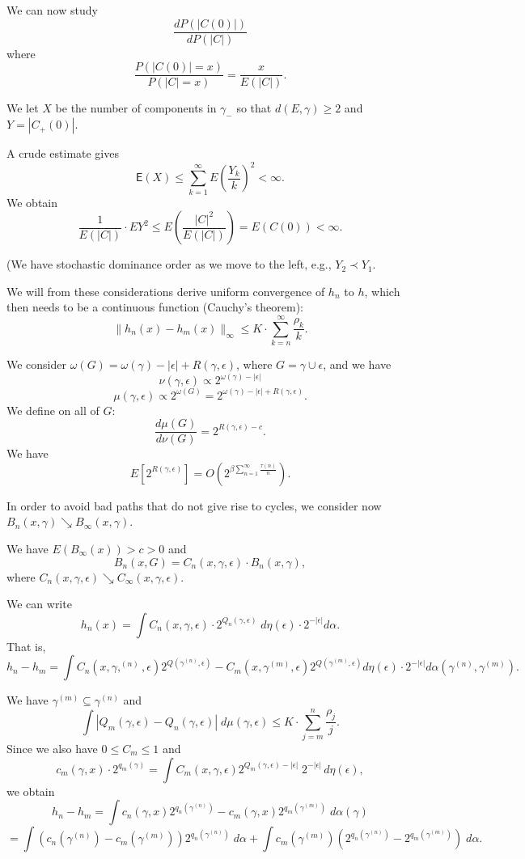 \documentclass[11pt, a4paper, oneside]{scrartcl}
\theoremstyle{definition}
\theoremstyle{remark}
\providecommand{\E}{\mathsf{E}}
\providecommand{\Ordo}[1]{{O(#1)}}
\providecommand{\e}{\epsilon}
\begin{document}
We can now study
$$\frac{dP(|C(0)|)}{dP(|C|)}$$
where
$$\frac{P(|C(0)|=x)}{P(|C|=x)}=\frac{x}{E(|C|)}.$$

We let $X$ be the number of components in $\gamma_{-}$ so that $d(E,\gamma)\geq 2$ and $Y=|C_+(0)|$. 

A crude estimate gives
 $$ 
 \E(X)\leq \sum_{k=1}^\infty E \left( \frac{Y_k}{k}\right)^2<\infty.  
 $$ 
 We obtain 
 $$\frac{1}{E(|C|)}\cdot E Y^2\leq E \left(\frac{|C|^2}{E(|C|)}\right)=E(C(0))<\infty.$$
 
 (We have stochastic dominance order as we move to the left, e.g.,  $Y_2 \prec Y_1$.
 
 We will from these considerations derive uniform convergence of $h_n$ to $h$,
 which then needs to be a continuous function (Cauchy's theorem):
 $$ \|h_n(x)-h_m(x)\|_{\infty}\leq K\cdot \sum_{k=n}^\infty \frac{\rho_k}{k}.$$
 
 We consider $\omega(G)=\omega (\gamma)-|\epsilon|+ R(\gamma, \epsilon)$, where $G=\gamma \cup \epsilon$, and we have 
 $$\nu(\gamma,\epsilon) \propto 2^{\omega(\gamma)-|\epsilon|}$$
 $$\mu(\gamma,\epsilon)\propto 2^{\omega (G)}= 2^{\omega(\gamma)-|\epsilon |+R(\gamma,\epsilon)}.$$
 We define on all of $G$:
 $$\frac{d\mu(G)}{d\nu(G)}=2^{R(\gamma,\epsilon)-c}.$$
 We have
 $$E \left[2^{R(\gamma, \epsilon)}\right] =
 \Ordo{2^{\beta \sum_{n=1}^\infty \frac{\tau(n)}{n}}}.$$
 
 In order to avoid bad paths that do not give rise to cycles, we consider now $B_n(x,\gamma)\searrow B_\infty (x,\gamma)$.
 
 We have $E(B_\infty (x))>c>0$ and 
 $$B_ n(x,G)=C_n(x, \gamma, \epsilon )\cdot B_n(x,\gamma),$$
 where $C_n(x,\gamma, \epsilon)\searrow C_\infty (x,\gamma, \epsilon)$.
 
 We can write
 $$h_n(x)=\int C_n(x,\gamma,\epsilon) \cdot 2^{Q_n(\gamma,\epsilon) }\; d\eta(\epsilon)\cdot 2^{-|\epsilon|} d\alpha.$$
 That is, 
 $$h_n-h_m=\int C_n(x,\gamma,^{(n)},\epsilon)2^{Q(\gamma^{(n)},\epsilon)}-C_m(x, \gamma^{(m)},\epsilon)2^{Q(\gamma^{(m)},\epsilon)}d\eta(\epsilon)\cdot 2^{-|\epsilon|} d\alpha(\gamma^{(n)},\gamma^{(m)}).$$
 
 We have $\gamma^{(m)}\subseteq \gamma^{(n)}$ and 
 $$\int |Q_m(\gamma,\e)-Q_n(\gamma,\e)|\; d\mu(\gamma,\epsilon)\leq K\cdot \sum_{j=m}^n \frac{\rho_j}{j}.$$
 Since we also have $0\leq C_m \leq 1$ and 
 $$c_m(\gamma,x)\cdot 2^{q_m(\gamma)}=\int C_m(x,\gamma,\epsilon)2^{Q_m (\gamma,\epsilon)-|\epsilon|}\; 2^{-|\epsilon|} \, d\eta(\epsilon),$$
 we obtain
 $$h_n-h_m=\int c_n(\gamma,x)2^{q_n(\gamma^{(n)})}-c_m(\gamma,x)2^{q_m(\gamma^{(m)})} \; d\alpha(\gamma)$$
 $$=\int \left(c_n(\gamma^{(n)})-c_m(\gamma^{(m)}) \right)2^{q_n(\gamma^{(n)})}\; d\alpha
 +\int c_m(\gamma^{(m)})\left(2^{q_n(\gamma^{(n)})}-2^{q_m(\gamma^{(m)})} \right) \; d\alpha.$$
\end{document}
